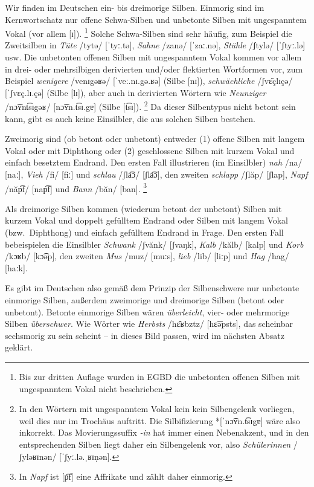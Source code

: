 Wir finden im Deutschen ein- bis dreimorige Silben.
Einmorig sind im Kernwortschatz nur offene Schwa-Silben und unbetonte Silben mit ungespanntem Vokal (vor allem [ɪ]).%
\footnote{Bis zur dritten Auflage wurden in EGBD die unbetonten offenen Silben mit ungespanntem Vokal nicht beschrieben.}
Solche Schwa-Silben sind sehr häufig, zum Beispiel die Zweitsilben in \textit{Tüte} /tytə/ [ˈtyː.tə], \textit{Sahne} /zanə/ [ˈzaː.nə], \textit{Stühle} /ʃtylə/ [ˈʃtyː.lə] usw.
Die unbetonten offenen Silben mit ungespanntem Vokal kommen vor allem in drei- oder mehrsilbigen derivierten und\slash oder flektierten Wortformen vor, zum Beispiel \textit{wenigere} /venɪgəʁə/ [ˈveː.nɪ.gə.ʁə] (Silbe [nɪ]), \textit{schwächliche} /ʃvɛ̆çlɪçə/ [ˈʃvɛç.lɪ.çə] (Silbe [lɪ]), aber auch in derivierten Wörtern wie \textit{Neunziger} /nɔ͡ʏnt͡sɪgəʁ/ [nɔ͡ʏn.t͡sɪ.gɐ] (Silbe [t͡sɪ]).%
\footnote{In den Wörtern mit ungespanntem Vokal kein kein Silbengelenk vorliegen, weil dies nur im Trochäus auftritt.
Die Silbifizierung *[ˈnɔ͡ʏn.t͡sɪg̣ɐ] wäre also inkorrekt.
Das Movierungssuffix \textit{-in} hat immer einen Nebenakzent, und in den entsprechenden Silben liegt daher ein Silbengelenk vor, also \textit{Schülerinnen} /ʃyləʁɪnən/ [ˈʃyː.lə.ˌʁɪṇən].}
Da dieser Silbentypus nicht betont sein kann, gibt es auch keine Einsilbler, die aus solchen Silben bestehen.

Zweimorig sind (ob betont oder unbetont) entweder (1) offene Silben mit langem Vokal oder mit Diphthong oder (2) geschlossene Silben mit kurzem Vokal und einfach besetztem Endrand.
Den ersten Fall illustrieren (im Einsilbler) \textit{nah} /na/ [naː], \textit{Vieh} /fi/ [fiː] und \textit{schlau} /ʃla͡ɔ/ [ʃla͡ɔ], den zweiten \textit{schlapp} /ʃlăp/ [ʃlap], \textit{Napf} /năp͡f/ [nap͡f] und \textit{Bann} /băn/ [ban].%
\footnote{In \textit{Napf} ist [p͡f] eine Affrikate und zählt daher einmorig.}

Als dreimorige Silben kommen (wiederum betont der unbetont) Silben mit kurzem Vokal und doppelt gefülltem Endrand oder Silben mit langem Vokal (bzw.\ Diphthong) und einfach gefülltem Endrand in Frage.
Den ersten Fall bebeispielen die Einsilbler \textit{Schwank} /ʃvănk/ [ʃvaŋk], \textit{Kalb} /kălb/ [kalp] und \textit{Korb} /kɔʁb/ [kɔ͡əp], den zweiten \textit{Mus} /muz/ [muːs], \textit{lieb} /lib/ [liːp] und \textit{Hag} /hag/ [haːk].

Es gibt im Deutschen also gemäß dem Prinzip der Silbenschwere nur unbetonte einmorige Silben, außerdem zweimorige und dreimorige Silben (betont oder unbetont).
Betonte einmorige Silben wären \textit{überleicht}, vier- oder mehrmorige Silben \textit{überschwer}.
Wie Wörter wie \textit{Herbsts} /hɛ̆ʁbztz/ [hɛ͡əpsts], das scheinbar sechsmorig zu sein scheint -- in dieses Bild passen, wird im nächsten Absatz geklärt.

